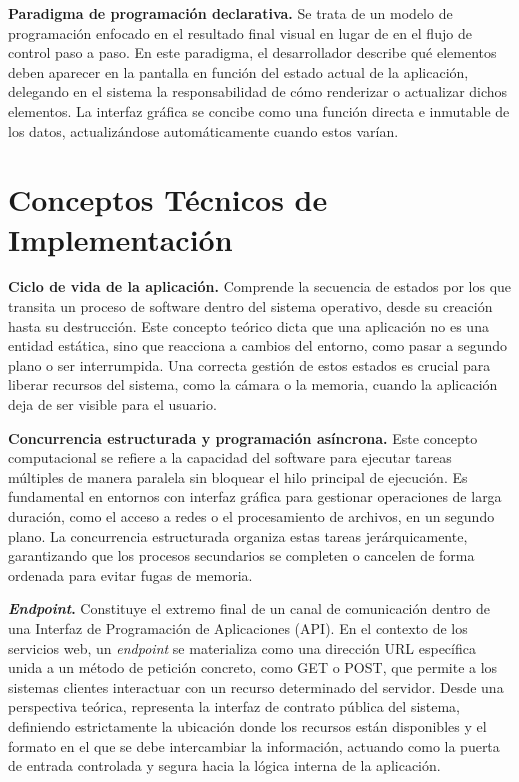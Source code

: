 \textbf{Paradigma de programación declarativa.} Se trata de un modelo de programación enfocado en el resultado final visual en lugar de en el flujo de control paso a paso. En este paradigma, el desarrollador describe qué elementos deben aparecer en la pantalla en función del estado actual de la aplicación, delegando en el sistema la responsabilidad de cómo renderizar o actualizar dichos elementos. La interfaz gráfica se concibe como una función directa e inmutable de los datos, actualizándose automáticamente cuando estos varían.

\section{Conceptos Técnicos de Implementación}

\textbf{Ciclo de vida de la aplicación.} Comprende la secuencia de estados por los que transita un proceso de software dentro del sistema operativo, desde su creación hasta su destrucción. Este concepto teórico dicta que una aplicación no es una entidad estática, sino que reacciona a cambios del entorno, como pasar a segundo plano o ser interrumpida. Una correcta gestión de estos estados es crucial para liberar recursos del sistema, como la cámara o la memoria, cuando la aplicación deja de ser visible para el usuario.

\textbf{Concurrencia estructurada y programación asíncrona.} Este concepto computacional se refiere a la capacidad del software para ejecutar tareas múltiples de manera paralela sin bloquear el hilo principal de ejecución. Es fundamental en entornos con interfaz gráfica para gestionar operaciones de larga duración, como el acceso a redes o el procesamiento de archivos, en un segundo plano. La concurrencia estructurada organiza estas tareas jerárquicamente, garantizando que los procesos secundarios se completen o cancelen de forma ordenada para evitar fugas de memoria.

\textbf{\textit{Endpoint}.} Constituye el extremo final de un canal de comunicación dentro de una Interfaz de Programación de Aplicaciones (API). En el contexto de los servicios web, un \textit{endpoint} se materializa como una dirección URL específica unida a un método de petición concreto, como GET o POST, que permite a los sistemas clientes interactuar con un recurso determinado del servidor. Desde una perspectiva teórica, representa la interfaz de contrato pública del sistema, definiendo estrictamente la ubicación donde los recursos están disponibles y el formato en el que se debe intercambiar la información, actuando como la puerta de entrada controlada y segura hacia la lógica interna de la aplicación.

